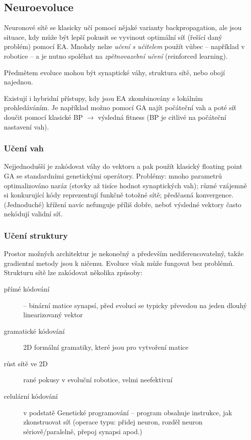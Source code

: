\subsection{Neuroevoluce}
\label{neuroevolution}
Neuronové sítě se klasicky učí pomocí nějaké varianty backpropagation, ale jsou situace, kdy může být lepší pokusit se vyvinout optimální síť (řešící daný problém) pomocí EA. Mnohdy nelze \textit{učení s učitelem} použít vůbec -- například v robotice -- a je nutno spoléhat na \textit{zpětnovazební učení} (reinforced learning).

Předmětem evoluce mohou být synaptické váhy, struktura sítě, nebo obojí najednou. 

Existují i hybridní přístupy, kdy jsou EA zkombinovány s lokálním prohledáváním. Je například možno pomocí GA najít počáteční vah a poté síť doučit pomocí klasické BP $\rightarrow$ výsledná fitness (BP je citlivé na počáteční nastavení vah).

\subsubsection{Učení vah}
Nejjednodušší je zakódovat váhy do vektoru a pak použít klasický floating point GA se standardními genetickými operátory. Problémy: mnoho parametrů optimalizováno naráz (stovky až tisíce hodnot synaptických vah); různé vzájemně si konkurující kódy reprezentují funkčně totožné sítě; předčasná konvergence. (Jednoduché) křížení navíc nefunguje příliš dobře, neboť výsledné vektory často nekódují validní síť.

\subsubsection{Učení struktury}
Prostor možných architektur je nekonečný a především nediferencovatelný, takže gradientní metody jsou k ničemu. Evoluce však může fungovat bez problémů.
Strukturu sítě lze zakódovat několika způsoby:
\begin{description}
	
	
	\item[přímé kódování] -- binární matice synapsí, před evolucí se typicky převedou na jeden dlouhý linearizovaný vektor 
	\item[gramatické kódování] 2D formální gramatiky, které jsou  pro vytvoření matice	
	\item[růst sítě ve 2D] rané pokusy v evoluční robotice, velmi neefektivní
	\item[celulární kódování] v podstatě Genetické programování -- program obsahuje instrukce, jak zkonstruovat síť (operace typu: přidej neuron, rozděl neuron sériově/paralelně, přepoj synapsi apod.)
\end{description}

